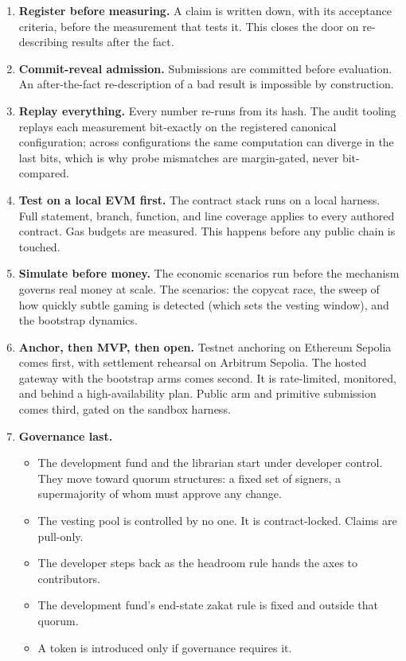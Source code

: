 \documentclass[11pt]{article}
\begin{document}
\begin{enumerate}
    \item \textbf{Register before measuring.} A claim is written down,
          with its acceptance criteria, before the measurement that tests
          it. This closes the door on re-describing results after the fact.
    \item \textbf{Commit-reveal admission.} Submissions are committed
          before evaluation. An after-the-fact re-description of a bad
          result is impossible by construction.
    \item \textbf{Replay everything.} Every number re-runs from its
          hash. The audit tooling replays each measurement bit-exactly on
          the registered canonical configuration; across configurations
          the same computation can diverge in the last bits, which is why
          probe mismatches are margin-gated, never bit-compared.
    \item \textbf{Test on a local EVM first.} The contract stack runs
          on a local harness. Full statement, branch, function, and line
          coverage applies to every authored contract. Gas budgets are
          measured. This happens before any public chain is touched.
    \item \textbf{Simulate before money.} The economic scenarios run
          before the mechanism governs real money at scale. The scenarios:
          the copycat race, the sweep of how quickly subtle gaming is
          detected (which sets the vesting window), and the bootstrap
          dynamics.
    \item \textbf{Anchor, then MVP, then open.} Testnet anchoring on
          Ethereum Sepolia comes first, with settlement rehearsal on
          Arbitrum Sepolia. The hosted gateway with the bootstrap arms
          comes second. It is rate-limited, monitored, and behind a
          high-availability plan. Public arm and primitive submission comes
          third, gated on the sandbox harness.
    \item \textbf{Governance last.}
          \begin{itemize}
              \item The development fund and the librarian start under
                    developer control. They move toward quorum structures: a fixed
                    set of signers, a supermajority of whom must approve any change.
              \item The vesting pool is controlled by no one. It is
                    contract-locked. Claims are pull-only.
              \item The developer steps back as the headroom rule hands the
                    axes to contributors.
              \item The development fund's end-state zakat rule is fixed and
                    outside that quorum.
              \item A token is introduced only if governance requires it.
          \end{itemize}
\end{enumerate}
\end{document}
